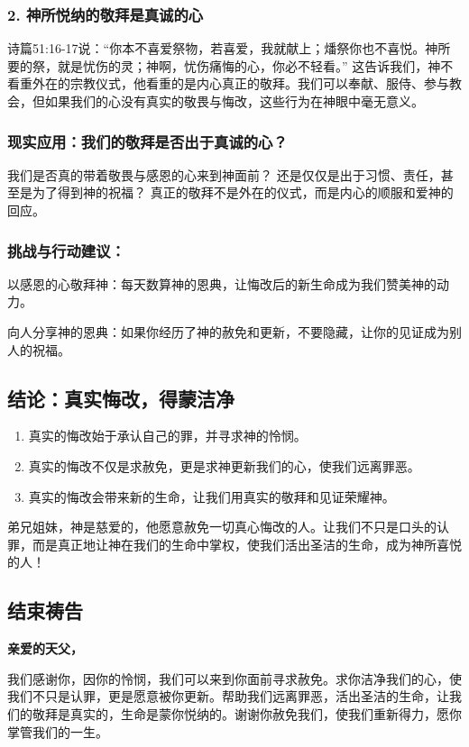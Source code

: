\documentclass[a4paper, 12pt]{article}
\begin{document}
\subsubsection*{2. 神所悦纳的敬拜是真诚的心}
诗篇51:16-17说：“你本不喜爱祭物，若喜爱，我就献上；燔祭你也不喜悦。神所要的祭，就是忧伤的灵；神啊，忧伤痛悔的心，你必不轻看。”
这告诉我们，神不看重外在的宗教仪式，他看重的是内心真正的敬拜。我们可以奉献、服侍、参与教会，但如果我们的心没有真实的敬畏与悔改，这些行为在神眼中毫无意义。
\subsubsection*{现实应用：我们的敬拜是否出于真诚的心？}
我们是否真的带着敬畏与感恩的心来到神面前？ 还是仅仅是出于习惯、责任，甚至是为了得到神的祝福？
真正的敬拜不是外在的仪式，而是内心的顺服和爱神的回应。
\subsubsection*{挑战与行动建议：}
\hspace{0.6cm}以感恩的心敬拜神：每天数算神的恩典，让悔改后的新生命成为我们赞美神的动力。

向人分享神的恩典：如果你经历了神的赦免和更新，不要隐藏，让你的见证成为别人的祝福。
\subsection*{结论：真实悔改，得蒙洁净}
\begin{enumerate}
    \item 真实的悔改始于承认自己的罪，并寻求神的怜悯。
    \item 真实的悔改不仅是求赦免，更是求神更新我们的心，使我们远离罪恶。

    \item 真实的悔改会带来新的生命，让我们用真实的敬拜和见证荣耀神。

\end{enumerate}

弟兄姐妹，神是慈爱的，他愿意赦免一切真心悔改的人。让我们不只是口头的认罪，而是真正地让神在我们的生命中掌权，使我们活出圣洁的生命，成为神所喜悦的人！

\subsection*{结束祷告}
\textbf{亲爱的天父，}

我们感谢你，因你的怜悯，我们可以来到你面前寻求赦免。求你洁净我们的心，使我们不只是认罪，更是愿意被你更新。帮助我们远离罪恶，活出圣洁的生命，让我们的敬拜是真实的，生命是蒙你悦纳的。谢谢你赦免我们，使我们重新得力，愿你掌管我们的一生。
\end{document}
